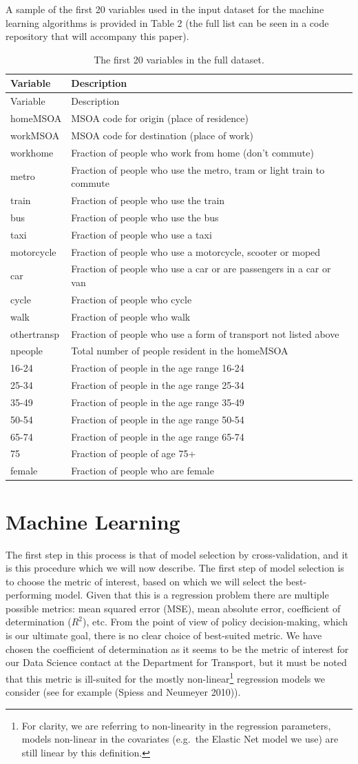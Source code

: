 \documentclass[11pt]{article}
\let\rmarkdownfootnote\footnote%
\def\footnote{\protect\rmarkdownfootnote}
\begin{document}
A sample of the first 20 variables used in the input dataset for the
machine learning algorithms is provided in Table 2 (the full list can be
seen in a code repository that will accompany this paper).

\begin{longtable}[]{@{}ll@{}}
\caption{The first 20 variables in the full dataset.}\tabularnewline
\toprule
Variable & Description\tabularnewline
\midrule
\endfirsthead
\toprule
Variable & Description\tabularnewline
\midrule
\endhead
homeMSOA & MSOA code for origin (place of residence)\tabularnewline
workMSOA & MSOA code for destination (place of work)\tabularnewline
workhome & Fraction of people who work from home (don't
commute)\tabularnewline
metro & Fraction of people who use the metro, tram or light train to
commute\tabularnewline
train & Fraction of people who use the train\tabularnewline
bus & Fraction of people who use the bus\tabularnewline
taxi & Fraction of people who use a taxi\tabularnewline
motorcycle & Fraction of people who use a motorcycle, scooter or
moped\tabularnewline
car & Fraction of people who use a car or are passengers in a car or
van\tabularnewline
cycle & Fraction of people who cycle\tabularnewline
walk & Fraction of people who walk\tabularnewline
othertransp & Fraction of people who use a form of transport not listed
above\tabularnewline
npeople & Total number of people resident in the homeMSOA\tabularnewline
16-24 & Fraction of people in the age range 16-24\tabularnewline
25-34 & Fraction of people in the age range 25-34\tabularnewline
35-49 & Fraction of people in the age range 35-49\tabularnewline
50-54 & Fraction of people in the age range 50-54\tabularnewline
65-74 & Fraction of people in the age range 65-74\tabularnewline
75 & Fraction of people of age 75+\tabularnewline
female & Fraction of people who are female\tabularnewline
\bottomrule
\end{longtable}

\section{Machine Learning}\label{machine-learning}

The first step in this process is that of model selection by
cross-validation, and it is this procedure which we will now describe.
The first step of model selection is to choose the metric of interest,
based on which we will select the best-performing model. Given that this
is a regression problem there are multiple possible metrics: mean
squared error (MSE), mean absolute error, coefficient of determination
(\(R^2\)), etc. From the point of view of policy decision-making, which
is our ultimate goal, there is no clear choice of best-suited metric. We
have chosen the coefficient of determination as it seems to be the
metric of interest for our Data Science contact at the Department for
Transport, but it must be noted that this metric is ill-suited for the
mostly non-linear\footnote{For clarity, we are referring to
  non-linearity in the regression parameters, models non-linear in the
  covariates (e.g.~the Elastic Net model we use) are still linear by
  this definition.} regression models we consider (see for example
(Spiess and Neumeyer 2010)).
\end{document}
